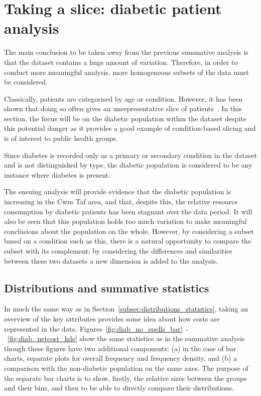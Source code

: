 \section{Taking a slice: diabetic patient analysis}\label{sec:diabetes}

The main conclusion to be taken away from the previous summative analysis is
that the dataset contains a huge amount of variation. Therefore, in order to
conduct more meaningful analysis, more homogeneous subsets of the data must be
considered.

Classically, patients are categorised by age or condition. However, it has been
shown that doing so often gives an unrepresentative slice of
patients~\cite{Vuik2016}. In this section, the focus will be on the diabetic
population within the dataset despite this potential danger as it provides a
good example of condition-based slicing and is of interest to public health
groups.

Since diabetes is recorded only as a primary or secondary condition in the
dataset and is not distinguished by type, the diabetic population is considered
to be any instance where diabetes is present.

The ensuing analysis will provide evidence that the diabetic population is
increasing in the Cwm Taf area, and that, despite this, the relative resource
consumption by diabetic patients has been stagnant over the data period. It will
also be seen that this population holds too much variation to make meaningful 
conclusions about the population on the whole. However, by considering a subset
based on a condition such as this, there is a natural opportunity to compare
the subset with its complement; by considering the differences and similarities
between these two datasets a new dimension is added to the analysis.


\subsection{Distributions and summative statistics}%
\label{subsec:diab_distributions_statistics}

In much the same way as in Section~\ref{subsec:distributions_statistics}, taking
an overview of the key attributes provides some idea about how costs are
represented in the data.
Figures~\ref{fig:diab_no_spells_bar}~\--~\ref{fig:diab_netcost_kde} show
the same statistics as in the summative analysis though these figures have two
additional components: (a) in the case of bar charts, separate plots for overall
frequency and frequency density, and (b) a comparison with the non-diabetic
population on the same axes. The purpose of the separate bar charts is to show,
firstly, the relative sizes between the groups and their bins, and then to be
able to directly compare their distributions.

